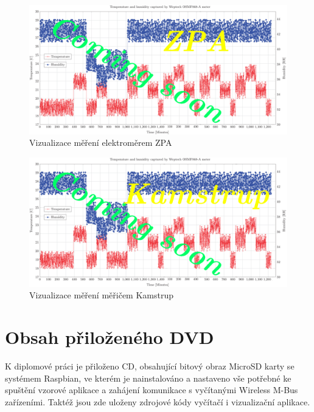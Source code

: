 \begin{landscape}
	 \begin{figure}[!ht]
  \begin{center}
    \includegraphics[scale=1.8]{obrazky/chart_zpa}
  \end{center}
  \caption{Vizualizace měření elektroměrem ZPA}
	\label{GrafPriloha3}
\end{figure}
	 \begin{figure}[!ht]
  \begin{center}
    \includegraphics[scale=1.8]{obrazky/chart_kamstrup}
  \end{center}
  \caption{Vizualizace měření měřičem Kamstrup}
	\label{GrafPriloha4}
\end{figure}
\end{landscape}

\chapter{Obsah přiloženého DVD}
\label{PrilohaMedium}
K diplomové práci je přiloženo CD, obsahující bitový obraz MicroSD karty se systémem Raspbian, ve kterém je nainstalováno a nastaveno vše potřebné ke spuštění vzorové aplikace a zahájení komunikace s vyčítanými Wireless M-Bus zařízeními. Taktéž jsou zde uloženy zdrojové kódy vyčítačí i vizualizační aplikace.

